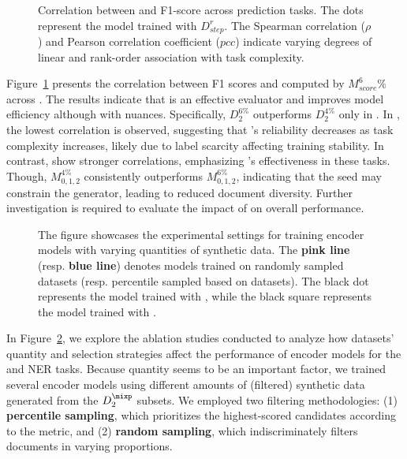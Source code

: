 \begin{figure}[htb]
    \centering
    \resizebox{0.85\textwidth}{!}{}
    \caption{Correlation between \score and F1-score across  prediction tasks. The dots represent the model trained with $D_{step}^{r}$. The Spearman correlation ($\rho$) and Pearson correlation coefficient ($pcc$) indicate varying degrees of linear and rank-order association with task complexity.}
    \label{fig:correlation-f1-semscore}
\end{figure}
Figure~\ref{fig:correlation-f1-semscore} presents the correlation between F1 scores and \score computed by $M_{score}^6\%$ across . The results indicate that \score is an effective evaluator and improves model efficiency although with nuances. Specifically, $D_{2}^{6\%}$ outperforms $D_{2}^{4\%}$ only in . In , the lowest correlation is observed, suggesting that \score’s reliability decreases as task complexity increases, likely due to label scarcity affecting training stability. In contrast,  show stronger correlations, emphasizing \score’s effectiveness in these tasks.
Though, $M_{0,1,2}^{4\%}$ consistently outperforms $M_{0,1,2}^{6\%}$, indicating that the seed may constrain the generator, leading to reduced document diversity. Further investigation is required to evaluate the impact of \rsft on overall performance.
\begin{figure}[htb]
    \centering
    \resizebox{.9\textwidth}{!}{}
    \caption{The figure showcases the experimental settings for training encoder models with varying quantities of synthetic data. The \textcolor{pinkLine}{\textbf{pink line}} (resp. \textcolor{blueLine}{\textbf{blue line}}) denotes models trained on randomly sampled datasets (resp. percentile sampled based on \score datasets). The black dot represents the model trained with \dgold, while the black square represents the model trained with \dgover.}
    \label{fig:samplings}
\end{figure}
In Figure~\ref{fig:samplings}, we explore the ablation studies conducted to analyze how datasets' quantity and selection strategies affect the performance of encoder models for the  and NER tasks.
Because quantity seems to be an important factor, we trained several encoder models using different amounts of (filtered) synthetic data generated from the $D_{2}^{\mixp}$ subsets. We employed two filtering methodologies: (1) \textbf{percentile sampling}, which prioritizes the highest-scored candidates according to the \score metric, and (2) \textbf{random sampling}, which indiscriminately filters documents in varying proportions.

